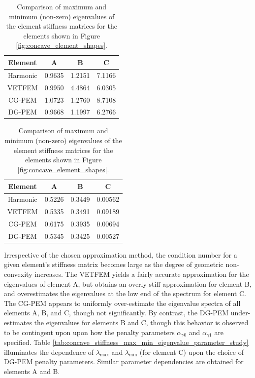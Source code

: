 \begin{table}
\centering
\begin{subtable}{.5\textwidth}
\centering
\begin{tabular}{| c || c | c | c |}
    \hline
		Element  & A      & B      & C \\ \hline \hline
		Harmonic	 & 0.9635 & 1.2151 & 7.1166 \\ \hline
		VETFEM	 & 0.9950 & 4.4864 & 6.0305 \\ \hline
		CG-PEM	 & 1.0723 & 1.2760 & 8.7108 \\ \hline
		DG-PEM	 & 0.9668 & 1.1997 & 6.2766 \\
    \hline
    \end{tabular}
    \caption{Largest eigenvalue: $\lambda_{\max}$}
    \label{tab:concave_stiffness_max_eigenvalue}
\end{subtable}%
\begin{subtable}{.5\textwidth}
\centering
\begin{tabular}{| c || c | c | c |}
    \hline
		Element  & A      & B      & C \\ \hline \hline
		Harmonic	 & 0.5226 & 0.3449 & 0.00562 \\ \hline
		VETFEM   & 0.5335 & 0.3491 & 0.09189 \\ \hline
		CG-PEM   & 0.6175 & 0.3935 & 0.00694 \\ \hline
		DG-PEM   & 0.5345 & 0.3425 & 0.00527 \\
    \hline
    \end{tabular}
    \caption{Smallest (non-zero) eigenvalue: $\lambda_{\min}$}
    \label{tab:concave_stiffness_min_eigenvalue}
\end{subtable}

\caption{Comparison of maximum and minimum (non-zero) eigenvalues of the element stiffness matrices for the elements shown in Figure \ref{fig:concave_element_shapes}.}
\label{tab:concave_stiffness_max_min_eigenvalue}
\end{table}

Irrespective of the chosen approximation method, the condition number for a given element's stiffness matrix becomes large as the degree of geometric non-convexity increases. The VETFEM yields a fairly accurate approximation for the eigenvalues of element A, but obtains an overly stiff approximation for element B, and overestimates the eigenvalues at the low end of the spectrum for element C. The CG-PEM appears to uniformly over-estimate the eigenvalue spectra of all elements A, B, and C, though not significantly. By contrast, the DG-PEM under-estimates the eigenvalues for elements B and C, though this behavior is observed to be contingent upon upon how the penalty parameters $\alpha_{\gamma0}$ and $\alpha_{\gamma1}$ are specified. Table \ref{tab:concave_stiffness_max_min_eigenvalue_parameter_study} illuminates the dependence of $\lambda_{\max}$ and $\lambda_{\min}$ (for element C) upon the choice of DG-PEM penalty parameters. Similar parameter dependencies are obtained for elements A and B.

